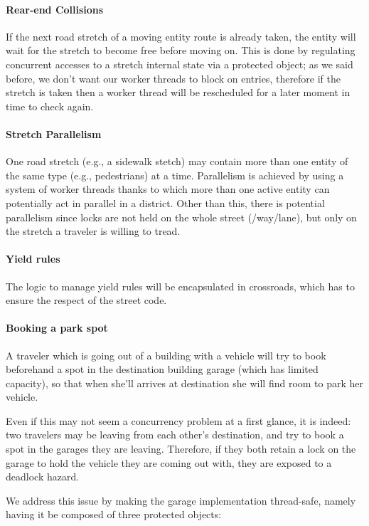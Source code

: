 \paragraph{Rear-end Collisions}
If the next road stretch of a moving entity route is already taken, the entity
will wait for the stretch to become free before moving on.
This is done by regulating concurrent accesses to a stretch internal state via
a protected object; as we said before, we don't want our worker threads to
block on entries, therefore if the stretch is taken then a worker thread will
be rescheduled for a later moment in time to check again.

\paragraph{Stretch Parallelism}
One road stretch (e.g., a sidewalk stetch) may contain more than one entity of
the same type (e.g., pedestrians) at a time.
Parallelism is achieved by using a system of worker threads thanks to which
more than one active entity can potentially act in parallel in a district.
Other than this, there is potential parallelism since locks are not held on the
whole street (/way/lane), but only on the stretch a traveler is willing to
tread.

\paragraph{Yield rules}
The logic to manage yield rules will be encapsulated in crossroads, which has
to ensure the respect of the street code.

\paragraph{Booking a park spot}
A traveler which is going out of a building with a vehicle will try to book
beforehand a spot in the destination building garage (which has limited
capacity), so that when she'll arrives at destination she will find room to
park her vehicle.

Even if this may not seem a concurrency problem at a first glance, it is
indeed: two travelers may be leaving from each other's destination, and try
to book a spot in the garages they are leaving.
Therefore, if they both retain a lock on the garage to hold the vehicle they
are coming out with, they are exposed to a deadlock hazard.

We address this issue by making the garage implementation thread-safe, namely
having it be composed of three protected objects:

